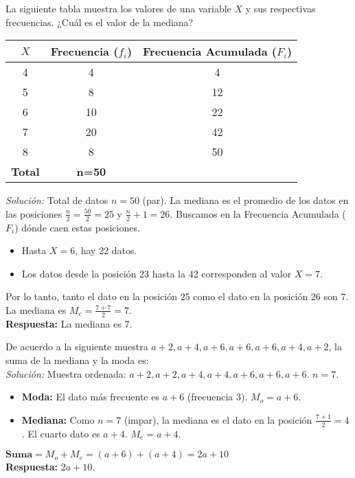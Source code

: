 \documentclass[12pt, letterpaper]{article}
\begin{document}
\vspace{1em} %
\noindent La siguiente tabla muestra los valores de una variable \(X\) y sus respectivas frecuencias. ¿Cuál es el valor de la mediana?
\begin{center}
    \begin{tabular}{|c|c|c|} %
        \hline
        \textbf{\(X\)} & \textbf{Frecuencia ($f_i$)} & \textbf{Frecuencia Acumulada ($F_i$)} \\
        \hline
        4 & 4 & 4 \\
        \hline
        5 & 8 & 12 \\
        \hline
        6 & 10 & 22 \\
        \hline
        7 & 20 & 42 \\
        \hline
        8 & 8 & 50 \\
        \hline
        \textbf{Total} & \textbf{n=50} & \\ %
        \hline
    \end{tabular}
\end{center}
\textit{Solución:}
Total de datos $n=50$ (par). La mediana es el promedio de los datos en las posiciones $\frac{n}{2} = \frac{50}{2}=25$ y $\frac{n}{2}+1 = 26$.
Buscamos en la Frecuencia Acumulada ($F_i$) dónde caen estas posiciones.
\begin{itemize}
    \item Hasta $X=6$, hay 22 datos.
    \item Los datos desde la posición 23 hasta la 42 corresponden al valor $X=7$.
\end{itemize}
Por lo tanto, tanto el dato en la posición 25 como el dato en la posición 26 son $7$.
La mediana es $M_e = \frac{7+7}{2} = 7$. \\
\textbf{Respuesta:} La mediana es 7.

\vspace{1em}
\noindent De acuerdo a la siguiente muestra \(a+2, a+4, a+6, a+6, a+6, a+4, a+2\), la suma de la mediana y la moda es: \\
\textit{Solución:}
Muestra ordenada: \(a+2, a+2, a+4, a+4, a+6, a+6, a+6\). $n=7$.
\begin{itemize}
    \item \textbf{Moda:} El dato más frecuente es \(a+6\) (frecuencia 3). $M_o = a+6$.
    \item \textbf{Mediana:} Como $n=7$ (impar), la mediana es el dato en la posición $\frac{7+1}{2}=4$. El cuarto dato es \(a+4\). $M_e = a+4$.
\end{itemize}
\(\textbf{Suma} = M_o + M_e = (a+6) + (a+4) = 2a+10\)\\
\textbf{Respuesta:} $2a+10$.
\end{document}
